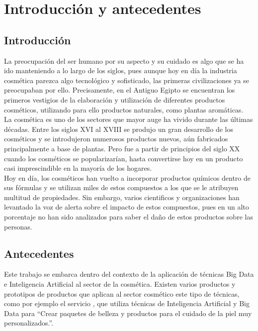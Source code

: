 
\chapter{Introducción y antecedentes} %
\label{chap:introduction} %

\section{Introducción}

La preocupación del ser humano por su aspecto y su cuidado es algo que se ha ido manteniendo a lo largo de los siglos, pues aunque hoy en día la industria cosmética parezca algo tecnológico y sofisticado, las primeras civilizaciones ya se preocupaban por ello. Precisamente, en el Antiguo Egipto se encuentran los primeros vestigios de la elaboración y utilización de diferentes productos cosméticos, utilizando para ello productos naturales, como plantas aromáticas. \\

La cosmética es uno de los sectores que mayor auge ha vivido durante las últimas décadas. Entre los siglos XVI al XVIII se produjo un gran desarrollo de los cosméticos y se introdujeron numerosos productos nuevos, aún fabricados principalmente a base de plantas. Pero fue a partir de principios del siglo XX cuando los cosméticos se popularizarían, hasta convertirse hoy en un producto casi imprescindible en la mayoría de los hogares. \\

Hoy en día, los cosméticos han vuelto a incorporar productos químicos dentro de sus fórmulas y se utilizan miles de estos compuestos a los que se le atribuyen multitud de propiedades. Sin embargo, varios cientificos y organizaciones han levantado la voz de alerta sobre el impacto de estos compuestos, pues en un alto porcentaje no han sido analizados para saber el daño de estos productos sobre las personas.





\section{Antecedentes}

Este trabajo se embarca dentro del contexto de la aplicación de técnicas Big Data e Inteligencia Artificial al sector de la cosmética. Existen varios productos y prototipos de productos que aplican al sector cosmético este tipo de técnicas, como por ejemplo el servicio \href{https://rewisor.com/la-ia-y-el-big-data-llegan-pisando-fuerte-al-mundo-de-la-cosmetica/}{}, que utiliza técnicas de Inteligencia Artificial y Big Data para ``Crear paquetes de belleza y productos para el cuidado de la piel muy personalizados.''. 





